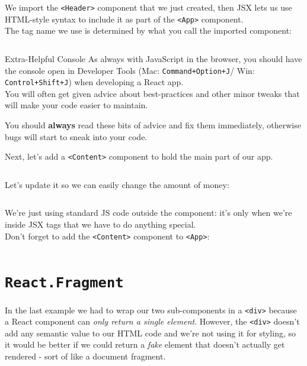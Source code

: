 \inputminted{jsx}{01/figures/02/04-App-with-Header.jsx}

We import the \texttt{<Header>} component that we just created, then JSX lets us use HTML-style syntax to include it as part of the \texttt{<App>} component.
\\

The tag name we use is determined by what you call the imported component:

\inputminted{jsx}{01/figures/02/05-App-with-Fishsticks.jsx}


\begin{infobox}{Extra-Helpful Console}
    As always with JavaScript in the browser, you should have the console open in Developer Tools (Mac: \texttt{Command+Option+J}/ Win: \texttt{Control+Shift+J}) when developing a React app.
    \\

    You will often get given advice about best-practices and other minor tweaks that will make your code easier to maintain.


    You should \textbf{always} read these bits of advice and fix them immediately, otherwise bugs will start to sneak into your code.
\end{infobox}


Next, let's add a \texttt{<Content>} component to hold the main part of our app.

\inputminted{jsx}{01/figures/02/06-Content.jsx}

Let's update it so we can easily change the amount of money:

\inputminted{jsx}{01/figures/02/07-Content-with-JS.jsx}

We're just using standard JS code outside the component: it's only when we're inside JSX tags that we have to do anything special.
\\

Don't forget to add the \texttt{<Content>} component to \texttt{<App>}:

\inputminted{jsx}{01/figures/02/08-Content-in-App.jsx}


\section{\texttt{React.Fragment}}

In the last example we had to wrap our two sub-components in a \texttt{<div>} because a React component can \textit{only return a single element}. However, the \texttt{<div>} doesn't add any semantic value to our HTML code and we're not using it for styling, so it would be better if we could return a \textit{fake} element that doesn't actually get rendered - sort of like a document fragment.
\\

